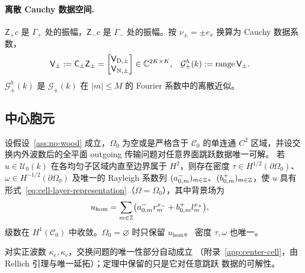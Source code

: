 \paragraph{离散 Cauchy 数据空间.}
$\mathsf Z_+c$ 是 $\Gamma_+$ 处的振幅，$\mathsf Z_-c$ 是 $\Gamma_-$ 处的振幅。按
$\nu_\pm=\pm e_x$ 换算为 Cauchy 数据系数，
\begin{align}
  \mathsf V_\pm&:=\mathsf C_\pm\mathsf Z_\pm
  =\begin{bmatrix}\mathsf V_{\mathrm D,\pm}\\ \mathsf V_{\mathrm N,\pm}\end{bmatrix}
  \in\mathbb{C}^{2K\times K},
  &\mathcal G^h_\pm(k)&:=\operatorname{range}\mathsf V_\pm.
  \label{eq:discrete-cauchy-space}
\end{align}
$\mathcal G^h_\pm(k)$ 是 $\mathcal G_\pm(k)$ 在 $|m|\leq M$ 的 Fourier 系数中的离散近似。

\subsection{中心胞元}
\label{subsec:center-cell}

\begin{theorem}[中心胞元的表示]
  \label{thm:center-cell-representation}
  设假设~\ref{ass:no-wood} 成立，$\Omega_0$ 为空或是严格含于 $\mathcal C_0$ 的单连通
  $C^2$ 区域，并设交换内外波数后的全平面 outgoing 传输问题对任意界面跳跃数据唯一可解。
  若 $u\in\mathcal U_0(k)$ 在各均匀子区域内直至边界属于 $H^2$，则存在密度
  $\tau\in H^{1/2}(\partial\Omega_0)$、$\omega\in H^{-1/2}(\partial\Omega_0)$ 及唯一的
  Rayleigh 系数列 $(a^-_{0,m})_{m\in\mathbb{Z}}$、$(b^+_{0,m})_{m\in\mathbb{Z}}$，使 $u$ 具有
  形式~\eqref{eq:cell-layer-representation}（$\Omega=\Omega_0$），其中背景场为
  \begin{align}
    u_{\mathrm{hom}}
    &=\sum_{m\in\mathbb{Z}}\bigl(a^-_{0,m}r_m^{x_-}+b^+_{0,m}l_m^{x_+}\bigr),
    \label{eq:center-homogeneous-field}
  \end{align}
  级数在 $H^1(\mathcal C_0)$ 中收敛。$\Omega_0=\varnothing$ 时只保留 $u_{\mathrm{hom}}$。
  密度 $\tau,\omega$ 也唯一。
\end{theorem}

对实正波数 $\kappa_{\mathrm e},\kappa_{\mathrm c}$，交换问题的唯一性部分自动成立
（附录~\ref{app:center-cell}，由 Rellich 引理与唯一延拓）；定理中保留的只是它对任意跳跃
数据的可解性。

